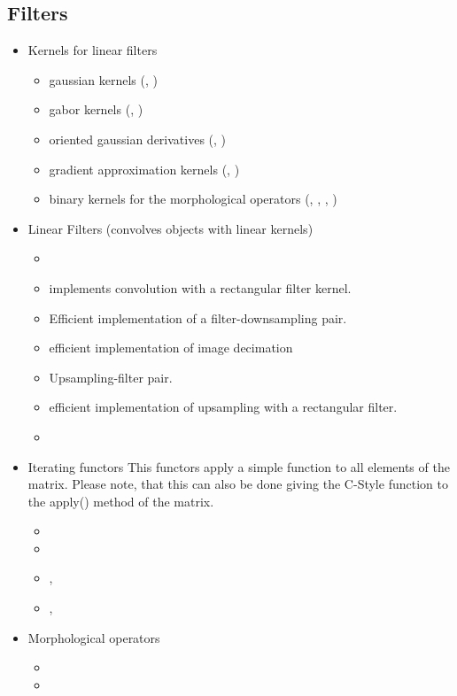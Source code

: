 \subsection{Filters}\label{filters}
\begin{itemize}
\item Kernels for linear filters\begin{itemize}
\item gaussian kernels (, )
\item gabor kernels (, )
\item oriented gaussian derivatives (,
  )
\item gradient approximation kernels (,
  )
\item binary kernels for the morphological operators
  (, ,
  , )
\end{itemize}
\item
Linear Filters (convolves objects with linear kernels)\begin{itemize}
\item
{}\item
{} implements convolution with a rectangular filter kernel.\item
{} Efficient implementation of a  filter-downsampling pair.\item
{} efficient implementation of image decimation\item
{} Upsampling-filter pair.\item
{} efficient implementation of upsampling with a rectangular filter.\item
{}\end{itemize}
\item
Iterating functors This functors apply a simple function to all elements of the matrix. Please note, that this can also be done giving the C-Style function to the apply() method of the matrix.\begin{itemize}
\item
{}\item
{}\item
{}, \item
{}, \end{itemize}
\end{itemize}
\begin{itemize}
\item
Morphological operators\begin{itemize}
\item
{}\item
{}\end{itemize}
\end{itemize}
